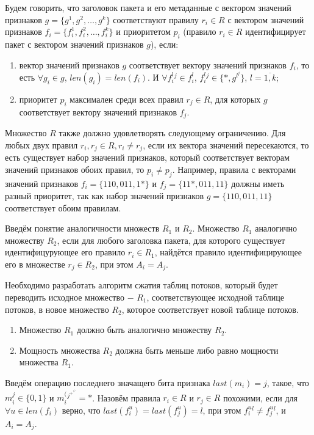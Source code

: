 \documentclass[a4peper, 12pt, titlepage, finall]{extreport}
\begin{document}
        Будем говорить, что заголовок пакета и его метаданные с вектором значений признаков \(g=\{g^1,g^2,\ldots,g^k\}\) 
        соответствуют правилу \(r_i\in R\) с вектором значений признаков \(f_i=\{f_i^1,f_i^2,\ldots,f_i^k\}\) 
        и приоритетом \(p_i\) (правило \(r_i\in R\) идентифицирует пакет с вектором значений признаков \(g\)), если:

        \begin{enumerate}
            \item вектор значений признаков \(g\) соответствует вектору значений признаков \(f_i\), 
                то есть \(\forall g_i \in g\), \(len(g_i) = len(f_i)\). И \(\forall f_i^l^j \in f_i^l\), \(f_i^l^j \in \{*, g^l^j\}\), \(l=\overline{1,k}\);
            \item приоритет \(p_i\) максимален среди всех правил \(r_j\in R\), для которых \(g\) соответствует вектору значений признаков \(f_j\).
        \end{enumerate}

        Множество \(R\) также должно удовлетворять следующему ограничению. 
        Для любых двух правил \(r_i,r_j\in R,r_i\not= r_j\), если их вектора значений пересекаются, то есть существует набор значений признаков, 
        который соответствует векторам значений признаков обоих правил, то \(p_i\not= p_j\). 
        Например, правила с векторами значений признаков \(f_i=\{110, 011, 1*\}\) и \(f_j=\{11*, 011, 11\}\) должны иметь разный приоритет, 
        так как набор значений признаков \(g=\{110, 011, 11\}\) соответствует обоим правилам.

        Введём понятие аналогичности множеств \(R_1\) и \(R_2\).
        Множество \(R_1\) аналогично множеству \(R_2\), если для любого заголовка пакета, для которого существует идентифицурующее его правило \(r_i \in R_1\), 
        найдётся правило идентифицирующее его в множестве \(r_j \in R_2\), при этом \(A_i = A_j\).

        Необходимо разработать алгоритм сжатия таблиц потоков, который будет переводить исходное множество $-$ \(R_1\), соответствующее исходной таблице потоков, в
        новое множество \(R_2\), которое соответствует новой таблице потоков.
        \begin{enumerate}
            \item Множество \(R_1\) должно быть аналогично множеству \(R_2\).
            \item Мощность множества \(R_2\) должна быть меньше либо равно мощности множества \(R_1\).
        \end{enumerate}

        Введём операцию последнего значащего бита признака \(last(m_i) = j\), такое, что \(m_i^j \in \{0, 1\}\) и \(m_i^(^j^+^1^) = *\). 
        Назовём правила \(r_i \in R\) и \(r_j \in R\) похожими, 
        если для \(\forall u \in len(f_i)\) верно, что \(last(f_i^u) = last(f_j^u) = l\), при этом \(f_i^u^l \neq f_j^u^l\), и \(A_i = A_j\).
    \fi
    \begingroup
    \let\clearpage\relax
    \printbibliography
    \endgroup
\end{document}
